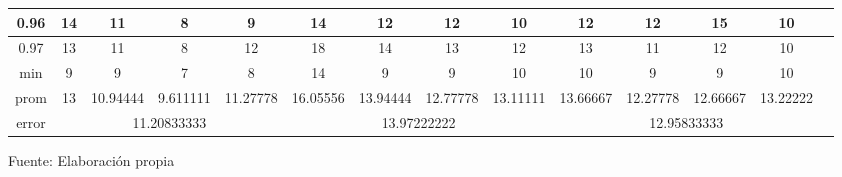\begin{center}
\begin{table}[H]
{\begin{tabular}{|c|c|c|c|c|c|c|c|c|c|c|c|c|c|}
\hline 
0.96 & 
14 & 11 & 8 & 9 & 14 & 12 & 12 & 10 & 12 & 12 & 15 & 10 \\
\hline 
0.97 & 
13 & 11 & 8 & 12 & 18 & 14 & 13 & 12 & 13 & 11 & 12 & 10 \\
\hline 
min & 
9 & 9 & 7 & 8 & 14 & 9 & 9 & 10 & 10 & 9 & 9 & 10 \\
\hline 
prom & 
13 & 10.94444 & 9.611111 & 11.27778 & 16.05556 & 13.94444 & 12.77778 & 13.11111 & 13.66667 & 12.27778 & 12.66667 & 13.22222 \\
\hline 
error & 
\multicolumn{4}{c|}{11.20833333} & 
\multicolumn{4}{c|}{13.97222222} & 
\multicolumn{4}{c|}{12.95833333}\\ 
\hline 
\end{tabular} 
}
\begin{center}
\vskip 0.2cm
{\small{Fuente: Elaboración propia}}
\end{center}
\end{table}
\end{center}

